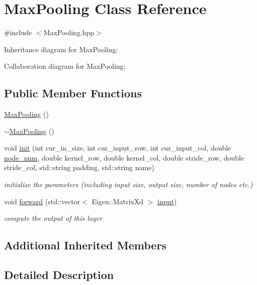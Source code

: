 \hypertarget{class_max_pooling}{}\section{Max\+Pooling Class Reference}
\label{class_max_pooling}


{\ttfamily \#include $<$Max\+Pooling.\+hpp$>$}



Inheritance diagram for Max\+Pooling\+:


Collaboration diagram for Max\+Pooling\+:
\subsection*{Public Member Functions}
\begin{DoxyCompactItemize}
\item 
\hyperlink{class_max_pooling_a30af265648a9a66ab4e6fd323a9b4027}{Max\+Pooling} ()
\item 
\hyperlink{class_max_pooling_aa2597b9c0c1ec6ca99053da08df5f628}{$\sim$\+Max\+Pooling} ()
\item 
void \hyperlink{class_max_pooling_ae1834354ff21a90fe14d1a392e923fc4}{init} (int cur\+\_\+in\+\_\+size, int cur\+\_\+input\+\_\+row, int cur\+\_\+input\+\_\+col, double \hyperlink{class_layer_a2f19878482d098654fb084b9c21b72ed}{node\+\_\+num}, double kernel\+\_\+row, double kernel\+\_\+col, double stride\+\_\+row, double stride\+\_\+col, std\+::string padding, std\+::string name)
\begin{DoxyCompactList}\small\item\em initialize the parameters (including input size, output size, number of nodes etc.) \end{DoxyCompactList}\item 
void \hyperlink{class_max_pooling_ae8556d4b6e3b583d02386b9b71b53a80}{forward} (std\+::vector$<$ Eigen\+::\+Matrix\+Xd $>$ \hyperlink{class_layer_a5213366d9a5a7317c5d40d9efdcfa623}{input})
\begin{DoxyCompactList}\small\item\em compute the output of this layer \end{DoxyCompactList}\end{DoxyCompactItemize}
\subsection*{Additional Inherited Members}


\subsection{Detailed Description}


